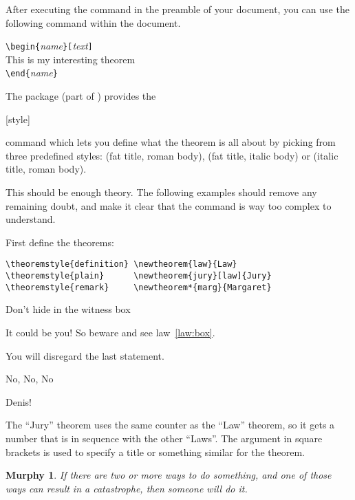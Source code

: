 After executing the  command in the preamble of your
document, you can use the following command within the document.
\begin{code}
\verb|\begin{|\emph{name}\verb|}[|\emph{text}\verb|]|\\
This is my interesting theorem\\
\verb|\end{|\emph{name}\verb|}|     
\end{code}

The  package (part of ) provides the
\begin{lscommand}
  [style]
\end{lscommand}
command which lets you define what the theorem is all about by picking
from three predefined styles:  (fat title, roman body),
 (fat title, italic body) or  (italic
title, roman body).

This should be enough theory. The following examples should
remove any remaining doubt, and make it clear that the
 command is way too complex to understand.

First define the theorems:

\begin{verbatim}
\theoremstyle{definition} \newtheorem{law}{Law}
\theoremstyle{plain}      \newtheorem{jury}[law]{Jury}
\theoremstyle{remark}     \newtheorem*{marg}{Margaret}
\end{verbatim}

\begin{example}
\begin{law}\label{law:box}
Don't hide in the witness box
\end{law}
\begin{jury}
It could be you! So beware and
see law~\ref{law:box}.\end{jury}
\begin{jury}
You will disregard the last
statement.\end{jury}
\begin{marg}No, No, No\end{marg}
\begin{marg}Denis!\end{marg}
\end{example}

The ``Jury'' theorem uses the same counter as the ``Law''
theorem, so it gets a number that is in sequence with
the other ``Laws''. The argument in square brackets is used to specify
a title or something similar for the theorem.
\begin{example}
\newtheorem{mur}{Murphy}[section]

\begin{mur} If there are two or 
more ways to do something, and 
one of those ways can result in
a catastrophe, then someone 
will do it.\end{mur}
\end{example}


